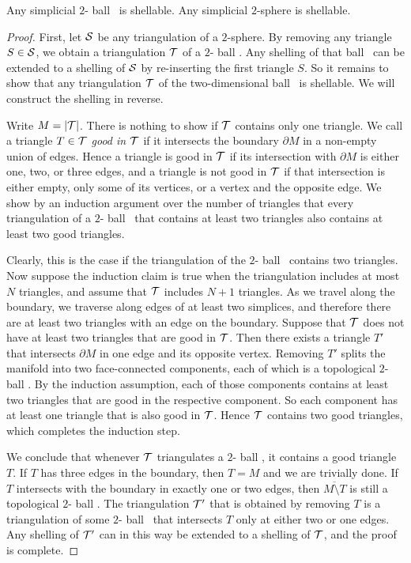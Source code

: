 \documentclass[10pt,a4paper]{article}
\newcommand\cye[1]{%
\protect\leavevmode
\begingroup
    \color{blue}%
    #1%
\endgroup
}
\newcommand{\disk}{\cye{ball}}
\begin{document}
\begin{lemma}\label{lemma:shell_2D}
    Any simplicial $2$-\disk\ is shellable.
    Any simplicial $2$-sphere is shellable. 
\end{lemma}
\begin{proof}
    First, 
    let ${\mathcal S}$ be any triangulation of a $2$-sphere. 
    By removing any triangle $S \in {\mathcal S}$, we obtain a triangulation ${\mathcal T}$ of a $2$-\disk.
    Any shelling of that \disk\ can be extended to a shelling of ${\mathcal S}$ by re-inserting the first triangle $S$.
    So it remains to show that any triangulation ${\mathcal T}$ of the two-dimensional \disk\ is shellable. 
    We will construct the shelling in reverse. 
    
    Write $M = \left| {\mathcal T} \right|$. 
    There is nothing to show if ${\mathcal T}$ contains only one triangle. 
    We call a triangle $T \in {\mathcal T}$ \emph{good in ${\mathcal T}$} if it intersects the boundary $\partial M$ in a non-empty union of edges. 
    Hence a triangle is good in ${\mathcal T}$ if its intersection with $\partial M$ is either one, two, or three edges,
    and a triangle is not good in ${\mathcal T}$ if that intersection is either empty, only some of its vertices, or a vertex and the opposite edge.
    We show by an induction argument over the number of triangles that every triangulation of a $2$-\disk\ that contains at least two triangles also contains at least two good triangles. 

    Clearly, this is the case if the triangulation of the $2$-\disk\ contains two triangles. 
    Now suppose the induction claim is true when the triangulation includes at most $N$ triangles,
    and assume that ${\mathcal T}$ includes $N+1$ triangles. 
    As we travel along the boundary, we traverse along edges of at least two simplices, 
    and therefore there are at least two triangles with an edge on the boundary. 
    Suppose that ${\mathcal T}$ does not have at least two triangles that are good in ${\mathcal T}$.
    Then there exists a triangle $T'$ that intersects $\partial M$ 
    in one edge and its opposite vertex.
    Removing $T'$ splits the manifold into two face-connected components, each of which is a topological $2$-\disk. 
    By the induction assumption, each of those components contains at least two triangles 
    that are good in the respective component. 
    So each component has at least one triangle that is also good in ${\mathcal T}$. 
    Hence ${\mathcal T}$ contains two good triangles, which completes the induction step. 
    
    We conclude that whenever ${\mathcal T}$ triangulates a $2$-\disk,
    it contains a good triangle $T$. 
    If $T$ has three edges in the boundary, then $T = M$ and we are trivially done. 
    If $T$ intersects with the boundary in exactly one or two edges, 
    then $\overline{M \setminus T}$ is still a topological $2$-\disk.
    The triangulation ${\mathcal T}'$ that is obtained by removing $T$
    is a triangulation of some $2$-\disk\ that intersects $T$ only at either two or one edges.
    Any shelling of ${\mathcal T}'$ can in this way be extended to a shelling of ${\mathcal T}$, and the proof is complete. 
\end{proof}
\end{document}
